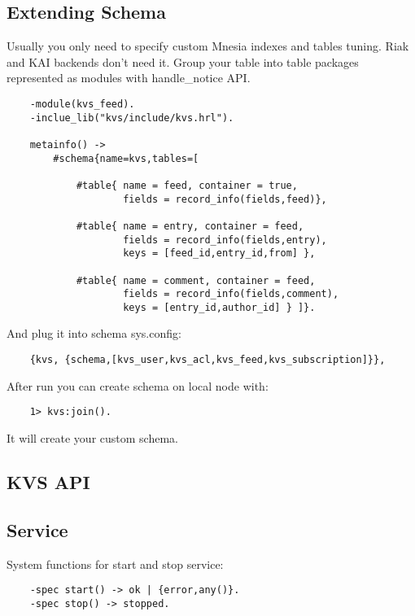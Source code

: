 \subsection{Extending Schema}

Usually you only need to specify custom Mnesia indexes and tables tuning.
Riak and KAI backends don't need it. Group your table into table packages
represented as modules with handle\_notice API.

\begin{lstlisting}
    -module(kvs_feed).
    -inclue_lib("kvs/include/kvs.hrl").

    metainfo() ->
        #schema{name=kvs,tables=[

            #table{ name = feed, container = true,
                    fields = record_info(fields,feed)},

            #table{ name = entry, container = feed,
                    fields = record_info(fields,entry),
                    keys = [feed_id,entry_id,from] },

            #table{ name = comment, container = feed,
                    fields = record_info(fields,comment),
                    keys = [entry_id,author_id] } ]}.
\end{lstlisting}

And plug it into schema sys.config:

\begin{lstlisting}
    {kvs, {schema,[kvs_user,kvs_acl,kvs_feed,kvs_subscription]}},
\end{lstlisting}

After run you can create schema on local node with:

\begin{lstlisting}
    1> kvs:join().
\end{lstlisting}

It will create your custom schema.

\subsection{KVS API}

\subsection{Service}
System functions for start and stop service:

\vspace{1\baselineskip}
\begin{lstlisting}
    -spec start() -> ok | {error,any()}.
    -spec stop() -> stopped.
\end{lstlisting}
\vspace{1\baselineskip}

